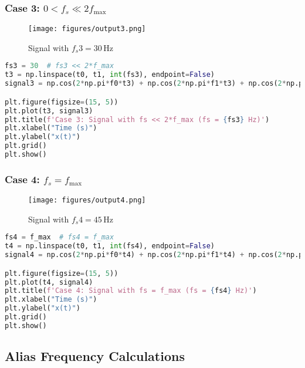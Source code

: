 \documentclass[10pt]{article}
\theoremstyle{definition}
\theoremstyle{remark}
\theoremstyle{definition}
\numberwithin{equation}{prob}
\begin{document}
\subsubsection{Case 3: \( 0 < f_s \ll 2f_{\text{max}} \)}

\begin{figure}[H]
    \centering
    \texttt{[image: figures/output3.png]}
    \caption{Signal with \( f_s3 = 30 \, \text{Hz} \)}
    \label{fig:case3}
\end{figure}

\begin{lstlisting}[language=Python, caption=Case 3 - Low sampling rate (aliasing)]
fs3 = 30  # fs3 << 2*f_max
t3 = np.linspace(t0, t1, int(fs3), endpoint=False)
signal3 = np.cos(2*np.pi*f0*t3) + np.cos(2*np.pi*f1*t3) + np.cos(2*np.pi*f2*t3) + np.cos(2*np.pi*f3*t3) + np.cos(2*np.pi*f4*t3)

plt.figure(figsize=(15, 5))
plt.plot(t3, signal3)
plt.title(f'Case 3: Signal with fs << 2*f_max (fs = {fs3} Hz)')
plt.xlabel("Time (s)")
plt.ylabel("x(t)")
plt.grid()
plt.show()
\end{lstlisting}

\subsubsection{Case 4: \( f_s = f_{\text{max}} \)}

\begin{figure}[H]
    \centering
    \texttt{[image: figures/output4.png]}
    \caption{Signal with \( f_s4 = 45 \, \text{Hz} \)}
    \label{fig:case4}
\end{figure}

\begin{lstlisting}[language=Python, caption=Case 4 - Sampling at maximum frequency]
fs4 = f_max  # fs4 = f_max
t4 = np.linspace(t0, t1, int(fs4), endpoint=False)
signal4 = np.cos(2*np.pi*f0*t4) + np.cos(2*np.pi*f1*t4) + np.cos(2*np.pi*f2*t4) + np.cos(2*np.pi*f3*t4) + np.cos(2*np.pi*f4*t4)

plt.figure(figsize=(15, 5))
plt.plot(t4, signal4)
plt.title(f'Case 4: Signal with fs = f_max (fs = {fs4} Hz)')
plt.xlabel("Time (s)")
plt.ylabel("x(t)")
plt.grid()
plt.show()
\end{lstlisting}

\subsection{Alias Frequency Calculations}
\end{document}
